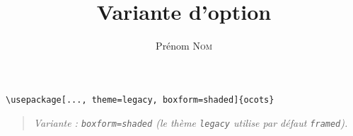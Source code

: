 \documentclass[11pt]{ocots-book}
\title{Variante d'option}
\author{Prénom \textsc{Nom}}
\newcommand{\ocotsvariantnote}[1]{\begin{quote}\itshape Variante : #1\end{quote}}
\begin{document}
\maketitle

\begin{lstlisting}
\usepackage[..., theme=legacy, boxform=shaded]{ocots}
\end{lstlisting}
\ocotsvariantnote{\texttt{boxform=shaded} (le th\`eme \texttt{legacy} utilise par d\'efaut \texttt{framed}).}

\end{document}
